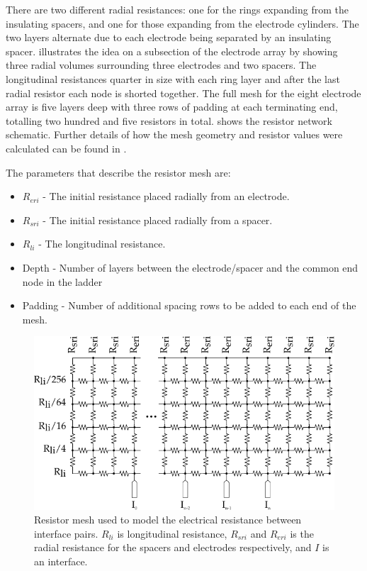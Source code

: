     There are two different radial resistances: one for the rings expanding from the insulating spacers, and one for those expanding from the electrode cylinders.
    The two layers alternate due to each electrode being separated by an insulating spacer.
     illustrates the idea on a subsection of the electrode array by showing three radial volumes surrounding three electrodes and two spacers.
    The longitudinal resistances quarter in size with each ring layer and after the last radial resistor each node is shorted together.
    The full mesh for the eight electrode array is five layers deep with three rows of padding at each terminating end, totalling two hundred and five resistors in total.
     shows the resistor network schematic.
    Further details of how the mesh geometry and resistor values were calculated can be found in \cite{Scott2014}.

    The parameters that describe the resistor mesh are:
    \begin{itemize}
    \item $R_{eri}$ - The initial resistance placed radially from an electrode.
    \item $R_{sri}$ - The initial resistance placed radially from a spacer.
    \item $R_{li}$ - The longitudinal resistance.
    \item Depth - Number of layers between the electrode/spacer and the common end node in the ladder
    \item Padding - Number of additional spacing rows to be added to each end of the mesh.
    \end{itemize}

    \begin{figure}
      \centering
      \includegraphics{content/pt2/07-InterfaceModel/graphics/resistorMesh}
      \caption{\label{fig:pt2-ResistorMesh}Resistor mesh used to model the electrical resistance between interface pairs. $R_{li}$ is longitudinal resistance, $R_{sri}$ and $R_{eri}$ is the radial resistance for the spacers and electrodes respectively, and $I$ is an interface.}
    \end{figure}


